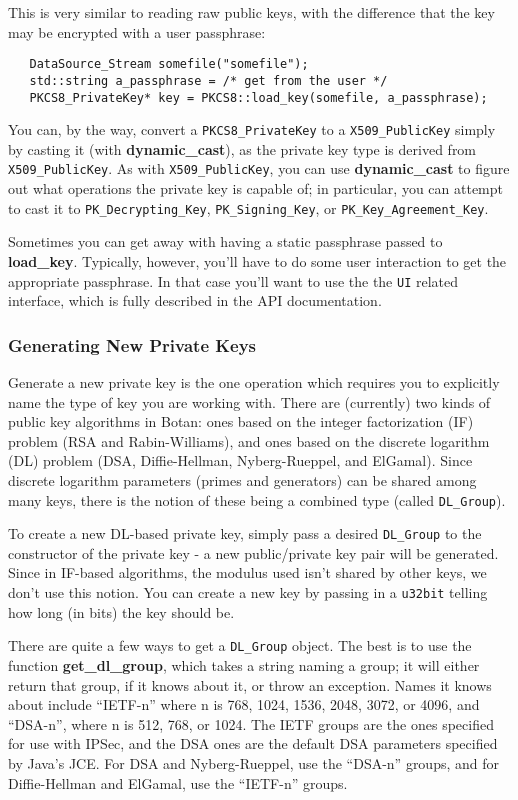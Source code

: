 \documentclass{article}
\newcommand{\function}[1]{\textbf{#1}}
\newcommand{\type}[1]{\texttt{#1}}
\begin{document}
This is very similar to reading raw public keys, with the difference that the
key may be encrypted with a user passphrase:

\begin{verbatim}
   DataSource_Stream somefile("somefile");
   std::string a_passphrase = /* get from the user */
   PKCS8_PrivateKey* key = PKCS8::load_key(somefile, a_passphrase);
\end{verbatim}

You can, by the way, convert a \type{PKCS8\_PrivateKey} to a
\type{X509\_PublicKey} simply by casting it (with \function{dynamic\_cast}), as
the private key type is derived from \type{X509\_PublicKey}. As with
\type{X509\_PublicKey}, you can use \function{dynamic\_cast} to figure out what
operations the private key is capable of; in particular, you can attempt to
cast it to \type{PK\_Decrypting\_Key}, \type{PK\_Signing\_Key}, or
\type{PK\_Key\_Agreement\_Key}.

Sometimes you can get away with having a static passphrase passed to
\function{load\_key}. Typically, however, you'll have to do some user
interaction to get the appropriate passphrase. In that case you'll want to use
the the \type{UI} related interface, which is fully described in the API
documentation.

\subsubsection{Generating New Private Keys}

Generate a new private key is the one operation which requires you to
explicitly name the type of key you are working with. There are (currently) two
kinds of public key algorithms in Botan: ones based on the integer
factorization (IF) problem (RSA and Rabin-Williams), and ones based on the
discrete logarithm (DL) problem (DSA, Diffie-Hellman, Nyberg-Rueppel, and
ElGamal). Since discrete logarithm parameters (primes and generators) can be
shared among many keys, there is the notion of these being a combined type
(called \type{DL\_Group}).

To create a new DL-based private key, simply pass a desired \type{DL\_Group} to
the constructor of the private key - a new public/private key pair will be
generated. Since in IF-based algorithms, the modulus used isn't shared by other
keys, we don't use this notion. You can create a new key by passing in a
\type{u32bit} telling how long (in bits) the key should be.

There are quite a few ways to get a \type{DL\_Group} object. The best is to use
the function \function{get\_dl\_group}, which takes a string naming a group; it
will either return that group, if it knows about it, or throw an
exception. Names it knows about include ``IETF-n'' where n is 768, 1024, 1536,
2048, 3072, or 4096, and ``DSA-n'', where n is 512, 768, or 1024. The IETF
groups are the ones specified for use with IPSec, and the DSA ones are the
default DSA parameters specified by Java's JCE. For DSA and Nyberg-Rueppel, use
the ``DSA-n'' groups, and for Diffie-Hellman and ElGamal, use the ``IETF-n''
groups.
\end{document}
